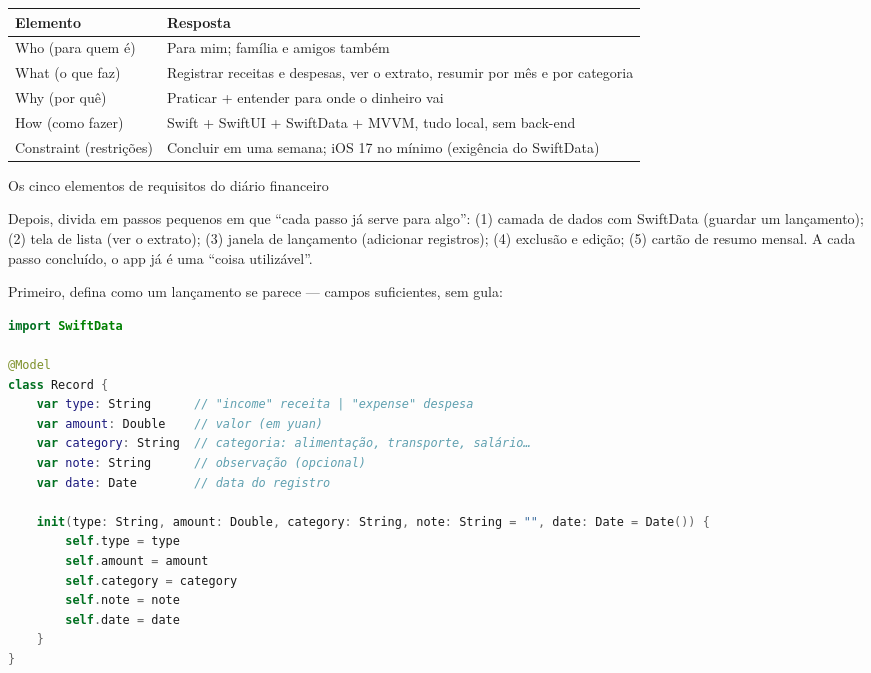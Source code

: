 


\begin{center}
\begin{tabularx}{\linewidth}{|X|X|}
\hline
\textbf{Elemento} & \textbf{Resposta} \tabularnewline
\hline
Who (para quem é) & Para mim; família e amigos também \tabularnewline
What (o que faz) & Registrar receitas e despesas, ver o extrato, resumir por mês e por categoria \tabularnewline
Why (por quê) & Praticar + entender para onde o dinheiro vai \tabularnewline
How (como fazer) & Swift + SwiftUI + SwiftData + MVVM, tudo local, sem back-end \tabularnewline
Constraint (restrições) & Concluir em uma semana; iOS 17 no mínimo (exigência do SwiftData) \tabularnewline
\hline
\end{tabularx}
\end{center}

\begin{center}\small\color{gray}Os cinco elementos de requisitos do diário financeiro\end{center}

Depois, divida em passos pequenos em que “cada passo já serve para algo”: (1) camada de dados com SwiftData (guardar um lançamento); (2) tela de lista (ver o extrato); (3) janela de lançamento (adicionar registros); (4) exclusão e edição; (5) cartão de resumo mensal. A cada passo concluído, o app já é uma “coisa utilizável”.


Primeiro, defina como um lançamento se parece — campos suficientes, sem gula:

\begin{lstlisting}[language=Swift]
import SwiftData

@Model
class Record {
    var type: String      // "income" receita | "expense" despesa
    var amount: Double    // valor (em yuan)
    var category: String  // categoria: alimentação, transporte, salário…
    var note: String      // observação (opcional)
    var date: Date        // data do registro

    init(type: String, amount: Double, category: String, note: String = "", date: Date = Date()) {
        self.type = type
        self.amount = amount
        self.category = category
        self.note = note
        self.date = date
    }
}
\end{lstlisting}

